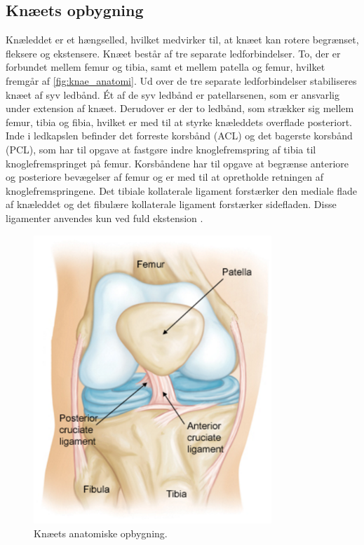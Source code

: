 \subsection{Knæets opbygning}
Knæleddet er et hængselled, hvilket medvirker til, at knæet kan rotere begrænset, fleksere og ekstensere. Knæet består af tre separate ledforbindelser. To, der er forbundet mellem femur og tibia, samt et mellem patella og femur, hvilket fremgår af \autoref{fig:knae_anatomi}. Ud over de tre separate ledforbindelser stabiliseres knæet af syv ledbånd. Ét af de syv ledbånd er patellarsenen, som er ansvarlig under extension af knæet. Derudover er der to ledbånd, som strækker sig mellem femur, tibia og fibia, hvilket er med til at styrke knæleddets overflade posteriort. Inde i ledkapslen befinder det forreste korsbånd (ACL) og det bagerste korsbånd (PCL), som har til opgave at fastgøre indre knoglefremspring af tibia til knoglefremspringet på femur. Korsbåndene har til opgave at begrænse anteriore og posteriore bevægelser af femur og er med til at opretholde retningen af knoglefremspringene. Det tibiale kollaterale ligament forstærker den mediale flade af knæleddet og det fibulære kollaterale ligament forstærker sidefladen. Disse ligamenter anvendes kun ved fuld ekstension \citep{martini2012}.

\begin{figure}[H]
\centering
\includegraphics[width=0.8\textwidth]{figures/knae_anatomi}
\caption{Knæets anatomiske opbygning.}%
\label{fig:knae_anatomi}
\end{figure} 


